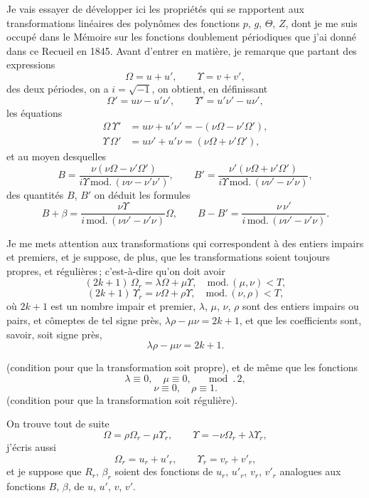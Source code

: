 \documentclass[11pt,a4paper]{book}
\begin{document}
Je vais essayer de d\'evelopper ici les propri\'et\'es qui se rapportent aux transformations
lin\'eaires des polyn\^omes des fonctions $p$, $g$, $\Theta$, $Z$, dont je me suis occup\'e dans le
M\'emoire sur les fonctions doublement p\'eriodiques que j'ai donn\'e dans ce Recueil en
1845. Avant d'entrer en mati\`ere, je remarque que partant des expressions
\[
\Omega = u + u',
\qquad \Upsilon = v + v',
\]
des deux p\'eriodes, on a $i = \sqrt{-1}$, on obtient, en d\'efinissant
\[
\Omega' = u\nu - u'\nu',
\qquad \Upsilon' = u'\nu' - u\nu',
\]
les \'equations
\begin{align*}
\Omega\,\Upsilon' &= u\nu + u'\nu' = -(\nu\Omega - \nu'\Omega'),\\
\Upsilon\,\Omega' &= u\nu' + u'\nu = (\nu\Omega + \nu'\Omega'),
\end{align*}
et au moyen desquelles
\[
B = \frac{\nu(\nu\Omega - \nu'\Omega')}{i\Upsilon\,\text{mod.}\,(\nu\nu - \nu'\nu')},
\qquad
B' = \frac{\nu'(\nu\Omega + \nu'\Omega')}{i\Upsilon\,\text{mod.}\,(\nu\nu' - \nu'\nu)},
\]
des quantit\'es $B$, $B'$ on d\'eduit les formules
\[
B + \beta = \frac{\nu\Upsilon}{i\,\text{mod.}\,(\nu\nu' - \nu'\nu)}\Omega,
\qquad
B - B' = \frac{\nu\,\nu'}{i\,\text{mod.}\,(\nu\nu' - \nu'\nu)}.
\]

\medskip

Je me mets attention aux transformations qui correspondent \`a des entiers impairs et
premiers, et je suppose, de plus, que les transformations soient toujours propres, et r\'eguli\`eres\,;
c'est-\`a-dire qu'on doit avoir
\[
(2k+1)\,\Omega_r = \lambda\Omega + \mu\Upsilon, \quad \text{mod.}\,(\mu, \nu) < T,
\]
\[
(2k+1)\,\Upsilon_r = \nu\Omega + \rho\Upsilon, \quad \text{mod.}\,(\nu, \rho) < T,
\]
o\`u $2k+1$ est un nombre impair et premier, $\lambda$, $\mu$, $\nu$, $\rho$ sont des entiers impairs ou
pairs, et c\^omeptes de tel signe pr\`es, $\lambda\rho - \mu\nu = 2k+1$, et que les coefficients
sont, savoir, soit signe pr\`es,
\[
\lambda\rho - \mu\nu = 2k+1.
\]

\medskip

(condition pour que la transformation soit propre), et de m\^eme que les fonctions
\[
\lambda \equiv 0,\quad \mu \equiv 0, \quad \mod.\,2,
\]
\[
\nu \equiv 0,\quad \rho \equiv 1.
\]
(condition pour que la transformation soit r\'eguli\`ere).

\medskip

On trouve tout de suite
\[
\Omega = \rho\Omega_r - \mu\Upsilon_r, \qquad \Upsilon = -\nu\Omega_r + \lambda\Upsilon_r,
\]
j'\'ecris aussi
\[
\Omega_r = u_r + u'_r,\qquad \Upsilon_r = v_r + v'_r,
\]
et je suppose que $R_r$, $\beta_r$ soient des fonctions de $u_r$, $u'_r$, $v_r$, $v'_r$ analogues aux fonctions
$B$, $\beta$, de $u$, $u'$, $v$, $v'$.
\end{document}
